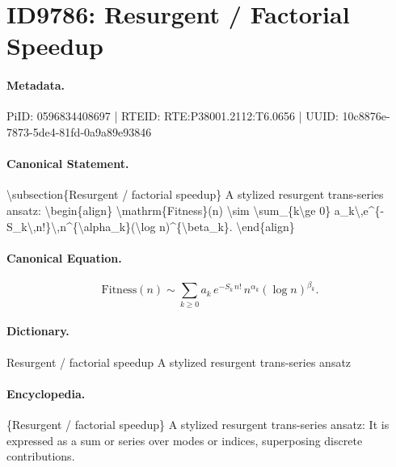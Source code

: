 \section*{ID9786: Resurgent / Factorial Speedup}
\paragraph{Metadata.}
PiID: 0596834408697 | RTEID: RTE:P38001.2112:T6.0656 | UUID: 10c8876e-7873-5de4-81fd-0a9a89e93846

\paragraph{Canonical Statement.}
\textbackslash{}subsection\{Resurgent / factorial speedup\} A stylized resurgent trans-series ansatz: \textbackslash{}begin\{align\} \textbackslash{}mathrm\{Fitness\}(n) \textbackslash{}sim \textbackslash{}sum\_\{k\textbackslash{}ge 0\} a\_k\textbackslash{},e\textasciicircum{}\{-S\_k\textbackslash{},n!\}\textbackslash{},n\textasciicircum{}\{\textbackslash{}alpha\_k\}(\textbackslash{}log n)\textasciicircum{}\{\textbackslash{}beta\_k\}. \textbackslash{}end\{align\}

\paragraph{Canonical Equation.}
\[
\mathrm{Fitness}(n) \sim \sum_{k\ge 0} a_k\,e^{-S_k\,n!}\,n^{\alpha_k}(\log n)^{\beta_k}.
\]

\paragraph{Dictionary.}
Resurgent / factorial speedup A stylized resurgent trans-series ansatz

\paragraph{Encyclopedia.}
\{Resurgent / factorial speedup\} A stylized resurgent trans-series ansatz: It is expressed as a sum or series over modes or indices, superposing discrete contributions.
